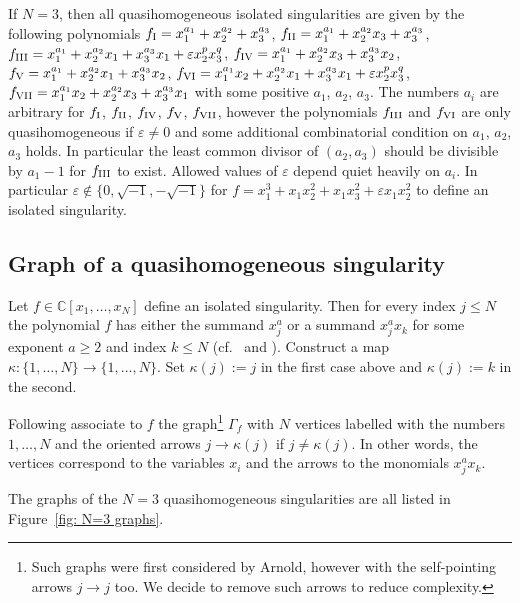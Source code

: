 \documentclass[10pt,a4paper]{amsart}
\numberwithin{equation}{section}
\newcommand{\CC}{{\mathbb{C}}}
\newcommand{\eps}{\varepsilon}
\begin{document}
\begin{Example}\label{ex: N=3 quasihomogeneous}
If $N = 3$, then all quasihomogeneous isolated singularities are given by the following polynomials $f_{\rm I} = x_1^{a_1} + x_2^{a_2}+ x_3^{a_3}$, $f_{\rm II} = x_1^{a_1} + x_2^{a_2}x_3 + x_3^{a_3}$, $f_{\rm III} = x_1^{a_1} + x_2^{a_2}x_1+ x_3^{a_3}x_1 + \eps x_2^{p}x_3^q$, $f_{\rm IV} = x_1^{a_1} + x_2^{a_2}x_3 + x_3^{a_3}x_2$,
	$f_{\rm V} = x_1^{a_1} + x_2^{a_2}x_1 + x_3^{a_3}x_2$, $f_{\rm VI} = x_1^{a_1}x_2 + x_2^{a_2}x_1 + x_3^{a_3}x_1 + \eps x_2^p x_3^q$, $f_{\rm VII} = x_1^{a_1}x_2 + x_2^{a_2}x_3 + x_3^{a_3}x_1$ with some positive $a_1$, $a_2$, $a_3$. The numbers $a_i$ are arbitrary for $f_{\rm I}$, $f_{\rm II}$, $f_{\rm IV}$, $f_{\rm V}$, $f_{\rm VII}$, however the polynomials $f_{\rm III}$ and $f_{\rm VI}$ are only quasihomogeneous if $\eps \neq 0$ and some additional combinatorial condition on $a_1$, $a_2$, $a_3$ holds. In particular the least common divisor of $(a_2,a_3)$ should be divisible by $a_1-1$ for $f_{\rm III}$ to exist. Allowed values of $\eps$ depend quiet heavily on $a_i$. In particular $\eps \not\in\lbrace 0,\sqrt{-1},-\sqrt{-1}\rbrace $ for $f = x_1^3 + x_1x_2^2 + x_1x_3^2 + \eps x_1x_2^2$ to define an isolated singularity.
\end{Example}

\subsection{Graph of a quasihomogeneous singularity}
Let $f \in \CC[x_1,\dots,x_N]$ define an isolated singularity. Then for every index $j \le N$ the polynomial $f$ has either the summand $x_j^{a}$ or a summand $x_j^ax_k$ for some exponent $a \ge 2$ and index $k \le N$ (cf.\ \cite[Korollar~1.6]{S71} and \cite[Theorem~2.2]{HK}). Construct a map $\kappa\colon \lbrace 1,\dots,N\rbrace \to \lbrace 1,\dots,N\rbrace$. Set $\kappa(j):=j$ in the first case above and $\kappa(j) := k$ in the second.

Following \cite[Section 3]{HK} associate to $f$ the graph\footnote{Such graphs were first considered by Arnold, however with the self-pointing arrows $j \to j$ too. We decide to remove such arrows to reduce complexity.}
$\Gamma_f$ with $N$ vertices labelled with the numbers $1,\dots,N$ and the oriented arrows $j \to \kappa(j)$ if $j \neq \kappa(j)$. In other words, the vertices correspond to the variables $x_i$ and the arrows to the monomials $x_j^ax_k$.

\begin{Example}
The graphs of the $N=3$ quasihomogeneous singularities are all listed in Figure~\ref{fig: N=3 graphs}.
\end{Example}
\end{document}
